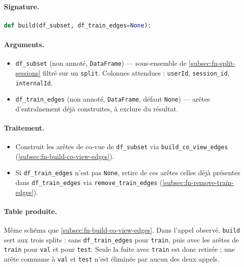 \documentclass[11pt,a4paper]{article}
\newcommand{\code}[1]{\texttt{\small #1}}
\begin{document}
\paragraph{Signature.}\leavevmode\par
\begin{lstlisting}[language=Python]
def build(df_subset, df_train_edges=None):
\end{lstlisting}

\paragraph{Arguments.}
\begin{itemize}[nosep,leftmargin=*]
  \item \code{df\_subset} (non annoté, \code{DataFrame}) --- sous-ensemble de
        \ref{subsec:fn-split-sessions} filtré sur un \code{split}. Colonnes
        attendues : \code{userId}, \code{session\_id}, \code{internalId}.
  \item \code{df\_train\_edges} (non annoté, \code{DataFrame}, défaut \code{None})
        --- arêtes d'entraînement déjà construites, à exclure du résultat.
\end{itemize}

\paragraph{Traitement.}
\begin{itemize}[nosep,leftmargin=*]
  \item Construit les arêtes de co-vue de \code{df\_subset} via
        \code{build\_co\_view\_edges} (\ref{subsec:fn-build-co-view-edges}).
  \item Si \code{df\_train\_edges} n'est pas \code{None}, retire de ces arêtes
        celles déjà présentes dans \code{df\_train\_edges} via
        \code{remove\_train\_edges} (\ref{subsec:fn-remove-train-edges}).
\end{itemize}

\paragraph{Table produite.}
Même schéma que \ref{subsec:fn-build-co-view-edges}. Dans l'appel observé,
\code{build} sert aux trois splits : sans \code{df\_train\_edges} pour
\code{train}, puis avec les arêtes de \code{train} pour \code{val} et pour
\code{test}. Seule la fuite avec \code{train} est donc retirée ; une arête commune
à \code{val} et \code{test} n'est éliminée par aucun des deux appels.
\end{document}
